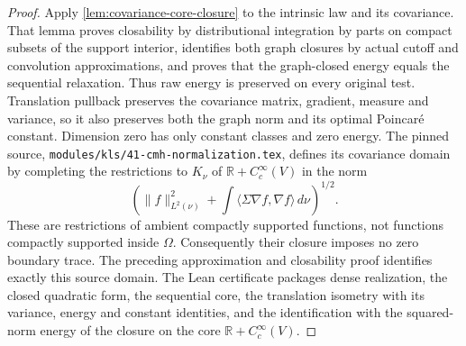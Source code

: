 \begin{proof}
  \leanok
  Apply \cref{lem:covariance-core-closure} to the intrinsic law and its covariance.
  That lemma proves closability by distributional integration by parts on compact subsets
  of the support interior, identifies both graph closures by actual cutoff and convolution
  approximations, and proves that the graph-closed energy equals the sequential relaxation.
  Thus raw energy is preserved on every original test. Translation pullback preserves the
  covariance matrix, gradient, measure and variance, so it also preserves both the graph norm
  and its optimal Poincar\'e constant. Dimension zero has only constant classes and zero energy.
  The pinned source, \texttt{modules/kls/41-cmh-normalization.tex}, defines its covariance
  domain by completing the restrictions to $K_\nu$ of $\mathbb R+C_c^\infty(V)$ in the norm
  \[
    \left(\|f\|_{L^2(\nu)}^2+
      \int\langle\Sigma\nabla f,\nabla f\rangle\,d\nu\right)^{1/2}.
  \]
  These are restrictions of ambient compactly supported functions, not functions compactly
  supported inside $\Omega$. Consequently their closure imposes no zero boundary trace.
  The preceding approximation and closability proof identifies exactly this source domain.
  The Lean certificate packages dense realization, the closed quadratic form, the sequential
  core, the translation isometry with its variance, energy and constant identities, and the
  identification with the squared-norm energy of the closure on the core $\mathbb R+C_c^\infty(V)$.
\end{proof}

